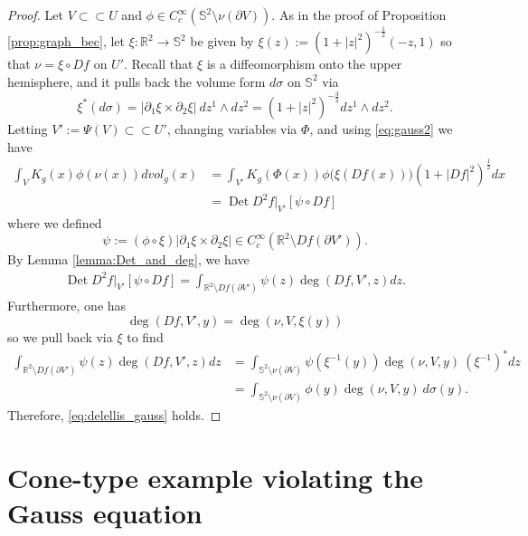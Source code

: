 \documentclass[12pt]{article}
\newcommand{\R}{\mathbb{R}}
\newcommand{\Det}{\operatorname{Det}}
\theoremstyle{plain}
\numberwithin{equation}{section}
\begin{document}
\begin{proof}
    Let $V \subset\subset U$ and $\phi \in C^\infty_c(\mathbb{S}^2 \setminus \nu(\partial V))$. As in the proof of Proposition \ref{prop:graph_bec}, let $\xi : \R^2 \to \mathbb{S}^2$ be given by $\xi(z) := (1+|z|^2)^{-\frac12}(-z,1)$ so that $\nu = \xi \circ Df$ on $U'$. Recall that $\xi$ is a diffeomorphism onto the upper hemisphere, and it pulls back the volume form $d\sigma$ on $\mathbb{S}^2$ via 
    \begin{equation*}
        \xi^*(d\sigma) = |\partial_1 \xi \times \partial_2 \xi|~dz^1 \wedge dz^2 = (1+|z|^2)^{-\frac32} dz^1 \wedge dz^2.
    \end{equation*}
    Letting $V' := \Psi(V) \subset \subset U'$, changing variables via $\Phi$, and using \eqref{eq:gauss2} we have
    \begin{align*}
        \int_V K_g(x)\phi(\nu(x))dvol_g(x) &= \int_{V'} K_g(\Phi(x)) \phi\big(\xi(Df(x))\big) (1+|Df|^2)^{\frac12} dx\\
        &= \Det D^2f|_{V'} [\psi \circ Df]
    \end{align*}
    where we defined
    \begin{equation*}
        \psi := (\phi \circ \xi ) |\partial_1\xi \times \partial_2 \xi| \in C^\infty_c(\R^2 \setminus Df(\partial V')).
    \end{equation*}
    By Lemma \ref{lemma:Det_and_deg}, we have
    \begin{align*}
        \Det D^2f|_{V'}[\psi\circ Df] = \int_{\R^2 \setminus Df(\partial V')} \psi(z) \deg(Df, V', z) dz.
    \end{align*}
    Furthermore, one has
    \begin{equation*}
        \deg(Df, V',y) = \deg(\nu,V,\xi(y))
    \end{equation*}
    so we pull back via $\xi$ to find
    \begin{align*}
        \int_{\R^2 \setminus Df(\partial V')} \psi(z) \deg(Df, V',z)dz &= \int_{\mathbb{S}^2 \setminus \nu(\partial V)} \psi(\xi^{-1}(y))\deg(\nu,V,y) ~(\xi^{-1})^*dz\\
        &= \int_{\mathbb{S}^2 \setminus \nu(\partial V)} \phi(y) \deg(\nu,V,y) ~d\sigma(y).
    \end{align*}
    Therefore, \eqref{eq:delellis_gauss} holds. 
\end{proof}

\section{Cone-type example violating the Gauss equation} \label{sec:examples}
\end{document}

